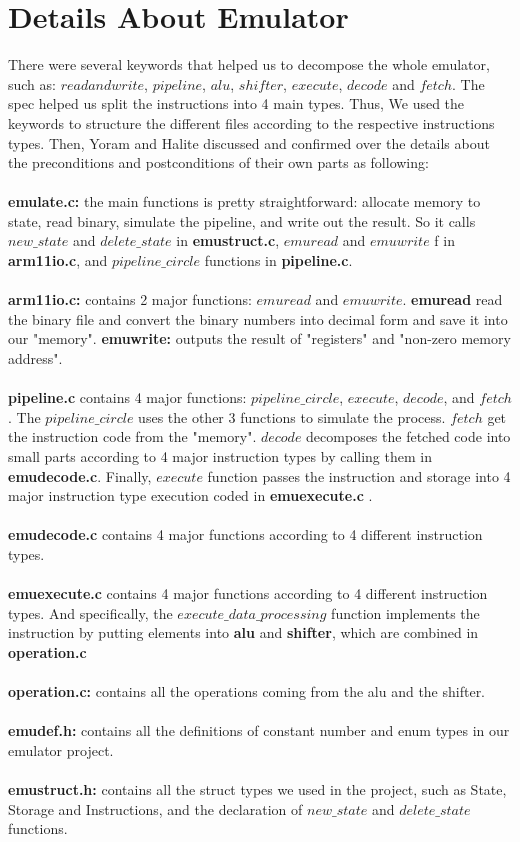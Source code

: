 \documentclass[a4paper]{article}
\begin{document}
\section{Details About Emulator}
There were several keywords that helped us to decompose the whole emulator, such as: $read and write$, $pipeline$, $alu$, $shifter$, $execute$, $decode$ and $fetch$. The spec helped us split the instructions into 4 main types. Thus, We used the keywords to structure the different files according to the respective instructions types. Then, Yoram and Halite discussed and confirmed over the details about the preconditions and postconditions of their own parts as following:
\\\\
\textbf{emulate.c:} the main functions is pretty straightforward: allocate memory to state, read binary, simulate the pipeline, and write out the result. So it calls $new\_state$ and $delete\_state$ in \textbf{emustruct.c}, $emuread$ and $emuwrite$ f in \textbf{arm11io.c}, and $pipeline\_circle$ functions in \textbf{pipeline.c}.
\\\\
\textbf{arm11io.c:} contains 2 major functions: $emuread$ and $emuwrite$. \textbf{emuread} read the binary file and convert the binary numbers into decimal form and save it into our "memory".
\textbf{emuwrite:} outputs the result of "registers" and "non-zero memory address".
\\\\
\textbf{pipeline.c} contains 4 major functions: $pipeline\_circle$, $execute$, $decode$, and $fetch$. The $pipeline\_circle$ uses the other 3 functions to simulate the process. $fetch$ get the instruction code from the "memory". $decode$ decomposes the fetched code into small parts according to 4 major instruction types by calling them in \textbf{emudecode.c}. Finally, $execute$ function passes the instruction and storage into 4 major instruction type execution coded in \textbf{emuexecute.c} .
\\\\
\textbf{emudecode.c} contains 4 major functions according to 4 different instruction types.
\\\\
\textbf{emuexecute.c} contains 4 major functions according to 4 different instruction types. And specifically, the $execute\_data\_processing$ function implements the instruction by putting elements into \textbf{alu} and \textbf{shifter}, which are combined in \textbf{operation.c}
\\\\
\textbf{operation.c:} contains all the operations coming from the alu and the shifter.
\\\\
\textbf{emudef.h:} contains all the definitions of constant number and enum types in our emulator project.
\\\\
\textbf{emustruct.h:} contains all the struct types we used in the project, such as State, Storage and Instructions, and the declaration of $new\_state$ and $delete\_state$ functions.
\end{document}
